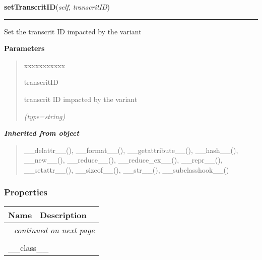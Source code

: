 \hspace{.8\funcindent}\begin{boxedminipage}{\funcwidth}

    \raggedright \textbf{setTranscritID}(\textit{self}, \textit{transcritID})

    \vspace{-1.5ex}

    \rule{\textwidth}{0.5\fboxrule}
\setlength{\parskip}{2ex}
    Set the transcrit ID impacted by the variant

\setlength{\parskip}{1ex}
      \textbf{Parameters}
      \vspace{-1ex}

      \begin{quote}
        \begin{Ventry}{xxxxxxxxxxx}

          \item[transcritID]

          transcrit ID impacted by the variant

            {\it (type=string)}

        \end{Ventry}

      \end{quote}

    \end{boxedminipage}


\large{\textbf{\textit{Inherited from object}}}

\begin{quote}
\_\_delattr\_\_(), \_\_format\_\_(), \_\_getattribute\_\_(), \_\_hash\_\_(), \_\_new\_\_(), \_\_reduce\_\_(), \_\_reduce\_ex\_\_(), \_\_repr\_\_(), \_\_setattr\_\_(), \_\_sizeof\_\_(), \_\_str\_\_(), \_\_subclasshook\_\_()
\end{quote}


  \subsubsection{Properties}

    \vspace{-1cm}
\hspace{\varindent}\begin{longtable}{|p{\varnamewidth}|p{\vardescrwidth}|l}
\cline{1-2}
\cline{1-2} \centering \textbf{Name} & \centering \textbf{Description}& \\
\cline{1-2}
\endhead\cline{1-2}\multicolumn{3}{r}{\small\textit{continued on next page}}\\\endfoot\cline{1-2}
\endlastfoot\multicolumn{2}{|l|}{\textit{Inherited from object}}\\
\multicolumn{2}{|p{\varwidth}|}{\raggedright \_\_class\_\_}\\
\cline{1-2}
\end{longtable}

